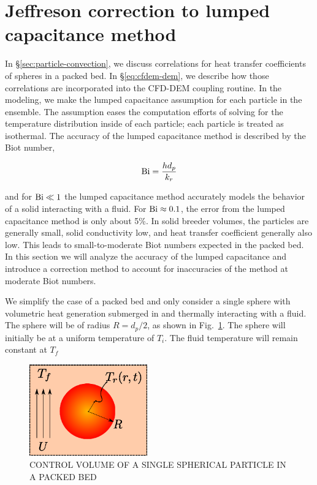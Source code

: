 \section{Jeffreson correction to lumped capacitance method}\label{sec:ht-jeffreson-correction}
In \S\ref{sec:particle-convection}, we discuss correlations for heat transfer coefficients of spheres in a packed bed. In \S\ref{eq:cfdem-dem}, we describe how those correlations are incorporated into the CFD-DEM coupling routine. In the modeling, we make the lumped capacitance assumption for each particle in the ensemble. The assumption eases the computation efforts of solving for the temperature distribution inside of each particle; each particle is treated as isothermal. The accuracy of the lumped capacitance method is described by the Biot number,

\begin{equation}
     \mathrm{Bi} = \frac{hd_p}{k_r}
\end{equation} 

and for $\mathrm{Bi} \ll 1$ the lumped capacitance method accurately models the behavior of a solid interacting with a fluid. For $\mathrm{Bi} \approx 0.1$, the error from the lumped capacitance method is only about 5\%. In solid breeder volumes, the particles are generally small, solid conductivity low, and heat transfer coefficient generally also low. This leads to small-to-moderate Biot numbers expected in the packed bed. In this section we will analyze the accuracy of the lumped capacitance and introduce a correction method to account for inaccuracies of the method at moderate Biot numbers.

We simplify the case of a packed bed and only consider a single sphere with volumetric heat generation submerged in and thermally interacting with a fluid. The sphere will be of radius $R=d_p/2$, as shown in Fig.~\ref{fig:ParticleControlVolume}. The sphere will initially be at a uniform temperature of $T_i$. The fluid temperature will remain constant at $T_f$

\begin{figure}[ht]
	\centering
		\includegraphics[width=2in]{chapters/figures/ParticleControlVolume}
	\caption[Control volume of single spherical particle in a packed bed]{CONTROL VOLUME OF A SINGLE SPHERICAL PARTICLE IN A PACKED BED}
	\label{fig:ParticleControlVolume}
\end{figure}



